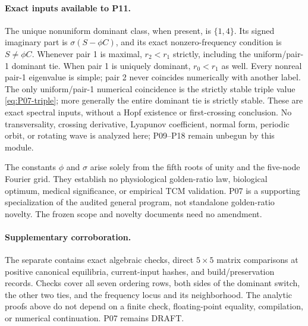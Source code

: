 \paragraph{Exact inputs available to P11.}
The unique nonuniform dominant class, when present, is $\{1,4\}$.
Its signed imaginary part is $\sigma(S-\phi C)$, and its exact
nonzero-frequency condition is $S\ne\phi C$. Whenever pair 1 is
maximal, $r_2<r_1$ strictly, including the uniform/pair-1 dominant tie.
When pair 1 is uniquely dominant, $r_0<r_1$ as well.
Every nonreal pair-1 eigenvalue is simple; pair 2 never coincides
numerically with another label. The only uniform/pair-1 numerical
coincidence is the strictly stable triple value
\eqref{eq:P07-triple}; more generally the entire dominant tie is
strictly stable. These are exact spectral inputs, without a Hopf
existence or first-crossing conclusion. No transversality, crossing
derivative, Lyapunov coefficient, normal form, periodic orbit, or rotating
wave is analyzed here; P09--P18 remain unbegun by this module.

\begin{remark}
\label{rem:P07-geometry}
The constants $\phi$ and $\sigma$ arise solely from the fifth roots of
unity and the five-node Fourier grid. They establish no physiological
golden-ratio law, biological optimum, medical significance, or empirical
TCM validation. P07 is a supporting specialization of the audited general
program, not standalone golden-ratio novelty. The frozen scope and
novelty documents need no amendment.
\end{remark}

\paragraph{Supplementary corroboration.}
The separate  contains exact algebraic
checks, direct $5\times5$ matrix comparisons at positive canonical
 equilibria, current-input hashes, and build/preservation records.
Checks cover all seven ordering rows, both sides of the dominant switch,
the other two ties, and the frequency locus and its neighborhood.
The analytic proofs above do not depend on a finite check, floating-point
equality, compilation, or numerical continuation. P07 remains DRAFT.

